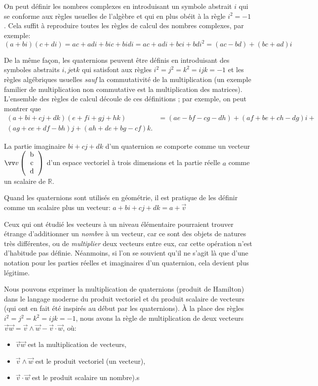 On peut définir les nombres complexes en introduisant un symbole abstrait $i$ qui se conforme aux 
règles usuelles de l'algèbre et qui en plus obéit à la règle $i^2 = - 1$. 
Cela suffit à reproduire toutes les règles de calcul des nombres complexes, 
par exemple: 
\[
(a + bi)(c + di) = ac + adi + bic + bidi = ac + adi + bci + bdi^{2} = (ac - bd) + (bc + ad) i
\]

De la même façon, les quaternions peuvent être définis en introduisant des symboles abstraits 
$i, j \text{et} k$ qui satisfont aux règles $i^2 = j^2 = k^2 = ijk = -1$ et les règles 
algébriques usuelles \emph{sauf} la commutativité de la multiplication (un exemple familier 
de multiplication non commutative est la multiplication des matrices). L'ensemble des règles 
de calcul découle de ces définitions ; par exemple, on peut montrer que 
\begin{align*}
(a+bi+cj+dk)(e+fi+gj+hk) &= (ae-bf-cg-dh)+(af+be+ch-dg)i+ \\
(ag+ce+df-bh)j + (ah+de+bg-cf)k.
\end{align*}

La partie imaginaire $bi+cj+dk$ d'un quaternion se comporte comme un vecteur $\vvv{v}{b}{c}{d}$
 d'un espace vectoriel à trois dimensions et la partie réelle $a$ comme un scalaire de $\mathbb{R}$.

Quand les quaternions sont utilisés en géométrie, il est pratique de les définir comme un 
scalaire plus un vecteur: $a+bi+cj+dk = a + \vec{v}$

Ceux qui ont étudié les vecteurs à un niveau élémentaire pourraient trouver étrange d'additionner 
un \emph{nombre} à un vecteur, car ce sont des objets de natures très différentes, ou de 
\emph{multiplier} deux vecteurs entre eux, car cette opération n'est d'habitude pas définie.
 Néanmoins, si l'on se souvient qu'il ne s'agit là que d'une notation pour les parties réelles et 
 imaginaires d'un quaternion, cela devient plus légitime.

Nous pouvons exprimer la multiplication de quaternions (produit de Hamilton) dans le langage moderne 
du produit vectoriel et du produit scalaire de vecteurs (qui ont en fait été inspirés au début par 
les quaternions). À la place des règles $i^2=j^2=k^2=ijk=-1$, nous avons la règle de multiplication 
de deux vecteurs $\vec{v}\vec{w}=\vec{v}\wedge\vec{w}-\vec{v}\cdot\vec{w}$, où:

\begin{itemize}
	\item $\vec{v}\vec{w}$ est la multiplication de vecteurs,
	\item $\vec{v}\wedge\vec{w}$ est le produit vectoriel (un vecteur),
	\item $\vec{v}\cdot\vec{w}$ est le produit scalaire un nombre).s
\end{itemize}

